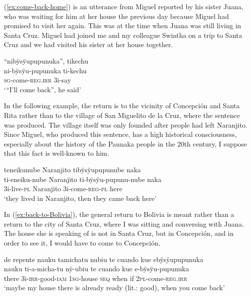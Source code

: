 (\ref{ex:come-back-home}) is an utterance from Miguel reported by his sister Juana, who was waiting for him at her house the previous day because Miguel had promised to visit her again. This was at the time when Juana was still living in Santa Cruz. Miguel had joined me and my colleague Swintha on a trip to Santa Cruz and we had visited his sister at her house together.

\ea\label{ex:come-back-home}
\begingl 
\glpreamble “nibÿsÿupupunuka”, tikechu\\
\gla ni-bÿsÿu-pupunuka ti-kechu\\ 
\textsc{sg}-come-\textsc{reg.irr} 3i-say\\ 
\glft ‘“I’ll come back”, he said’\\ 
\endgl
\trailingcitation{[jxx-p120430l-1.124]}
\xe

In the following example, the return is to the vicinity of Concepción and Santa Rita rather than to the village of San Miguelito de la Cruz, where the sentence was produced. The village itself was only founded after people had left Naranjito. Since Miguel, who produced this sentence, has a high historical consciousness, especially about the history of the Paunaka people in the 20th century, I suppose that this fact is well-known to him. %

\ea\label{ex:Naranjito-back-here}
\begingl 
\glpreamble teneikunube Naranjito tibÿsÿupupunube naka\\
\gla ti-eneiku-nube Naranjito ti-bÿsÿu-pupunu-nube naka\\ 
\glb 3i-live-\textsc{pl} Naranjito 3i-come-\textsc{reg}-\textsc{pl} here\\ 
\glft ‘they lived in Naranjito, then they came back here’\\ 
\endgl
\trailingcitation{[mqx-p110826l.084]}
\xe


In (\ref{ex:back-to-Bolivia}), the general return to Bolivia is meant rather than a return to the city of Santa Cruz, where I was sitting and conversing with Juana. The house she is speaking of is not in Santa Cruz, but in Concepción, and in order to see it, I would have to come to Concepción.

\ea\label{ex:back-to-Bolivia}
\begingl 
\glpreamble de repente nauku tamichatu nubiu te cuando kue ebÿsÿupupunuka\\
 nauku ti-a-micha-tu nÿ-ubiu te cuando kue e-bÿsÿu-pupunuka\\ 
 there 3i-\textsc{irr}-good-\textsc{iam} 1\textsc{sg}-house \textsc{seq} when if 2\textsc{pl}-come-\textsc{reg.irr}\\ 
\glft ‘maybe my house there is already ready (lit.: good), when you come back’\\ 
\endgl
\trailingcitation{[jxx-p120430l-1.427]}
\xe 

